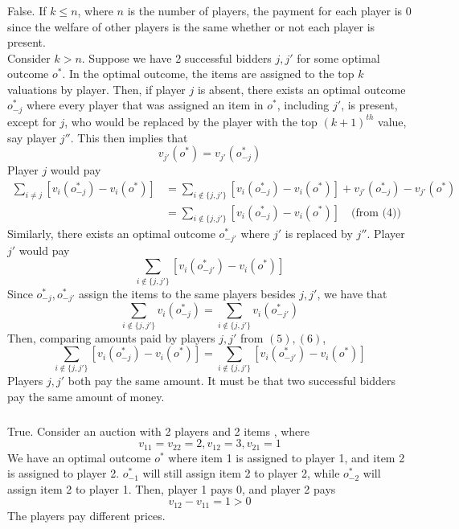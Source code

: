 \subsubsection{}
False.
If $k\leq n$, where $n$ is the number of players,
the payment for each player is $0$ since the welfare of other
players is the same whether or not each player is present.\\
Consider $k>n$. 
Suppose we have 2 successful bidders $j,j'$ for some optimal outcome $o^*$.
In the optimal outcome, the items are assigned to the top $k$ valuations
by player.
Then, if player $j$ is absent, there exists an optimal outcome $o_{-j}^*$
where every player that was assigned an item in $o^*$, including $j'$,
is present, except for $j$, who would be replaced by the player with
the top $(k+1)^{th}$ value, say player $j''$.
This then implies that
\begin{equation}
    v_{j'}(o^*)=v_{j'}(o_{-j}^*)
\end{equation}
Player $j$ would pay
\begin{equation}
\begin{aligned}
    \sum_{i\neq j}[v_i(o_{-j}^*) - v_i(o^*)]
    &= \sum_{i\notin \{j,j'\}} 
    [v_i(o_{-j}^*) - v_i(o^*)] + v_{j'}(o_{-j}^*) - v_{j'}(o^*)\\
    &= \sum_{i\notin \{j,j'\}} [v_i(o_{-j}^*) - v_i(o^*)]
    \quad\text{(from (4))}
\end{aligned}
\end{equation}
Similarly, there exists an optimal outcome $o_{-j'}^*$
where $j'$ is replaced by $j''$. Player $j'$ would pay
\begin{equation}
    \sum_{i\notin \{j,j'\}} [v_i(o_{-j'}^*) - v_i(o^*)]
\end{equation}
Since $o_{-j}^*,o_{-j'}^*$ assign the items to the same players
besides $j,j'$, we have that
\begin{equation}
    \sum_{i\notin \{j,j'\}} v_i(o_{-j}^*) 
    = \sum_{i\notin \{j,j'\}} v_i(o_{-j'}^*)
\end{equation}
Then, comparing amounts paid by players $j,j'$ from $(5),(6)$,
\[\sum_{i\notin \{j,j'\}} [v_i(o_{-j}^*) - v_i(o^*)]
= \sum_{i\notin \{j,j'\}} [v_i(o_{-j'}^*) - v_i(o^*)]\]
Players $j,j'$ both pay the same amount.
It must be that two successful bidders pay the same amount of money.

\subsubsection{}
True. Consider an auction with 2 players and 2 items , where
\[v_{11}=v_{22}=2, v_{12}=3, v_{21}=1\]
We have an optimal outcome $o^*$ where item 1 is assigned to player 1,
and item 2 is assigned to player 2.
$o_{-1}^*$ will still assign item 2 to player 2,
while $o_{-2}^*$ will assign item 2 to player 1.
Then, player 1 pays 0, and player 2 pays 
\[v_{12}-v_{11}=1>0\]
The players pay different prices.

